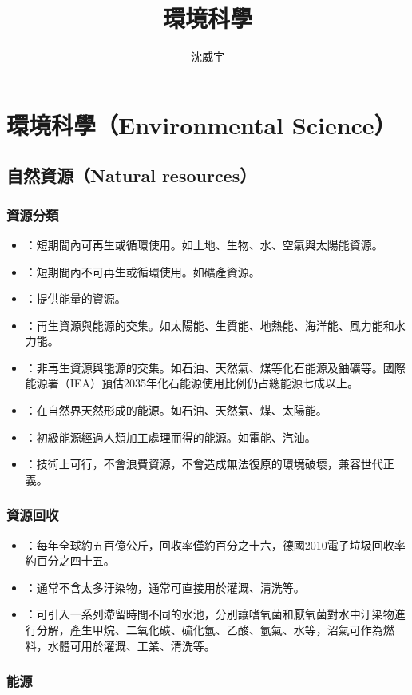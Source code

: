 \documentclass[a4paper,12pt]{report}
\begin{document}
\title{環境科學}
\author{沈威宇}
\date{\temtoday}
\titletocdoc
\chapter{環境科學（Environmental Science）}


\section{自然資源（Natural resources）}
\subsection{資源分類}
\begin{itemize}
\item {}：短期間內可再生或循環使用。如土地、生物、水、空氣與太陽能資源。
\item {}：短期間內不可再生或循環使用。如礦產資源。
\item {}：提供能量的資源。
\item {}：再生資源與能源的交集。如太陽能、生質能、地熱能、海洋能、風力能和水力能。
\item {}：非再生資源與能源的交集。如石油、天然氣、煤等化石能源及鈾礦等。國際能源署（IEA）預估2035年化石能源使用比例仍占總能源七成以上。
\item {}：在自然界天然形成的能源。如石油、天然氣、煤、太陽能。
\item {}：初級能源經過人類加工處理而得的能源。如電能、汽油。
\item {}：技術上可行，不會浪費資源，不會造成無法復原的環境破壞，兼容世代正義。
\end{itemize}
\subsection{資源回收}
\begin{itemize}
\item {}：每年全球約五百億公斤，回收率僅約百分之十六，德國2010電子垃圾回收率約百分之四十五。
\item {}：通常不含太多汙染物，通常可直接用於灌溉、清洗等。
\item {}：可引入一系列滯留時間不同的水池，分別讓嗜氧菌和厭氧菌對水中汙染物進行分解，產生甲烷、二氧化碳、硫化氫、乙酸、氫氣、水等，沼氣可作為燃料，水體可用於灌溉、工業、清洗等。
\end{itemize}
\subsection{能源}
\end{document}
